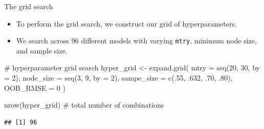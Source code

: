 \documentclass[
  10pt,
  ignorenonframetext,
]{beamer}
\newenvironment{Shaded}{}{}
\newcommand{\CommentTok}[1]{\textcolor[rgb]{0.00,0.50,0.00}{#1}}
\newcommand{\DataTypeTok}[1]{#1}
\newcommand{\DecValTok}[1]{#1}
\newcommand{\FloatTok}[1]{#1}
\newcommand{\KeywordTok}[1]{\textcolor[rgb]{0.00,0.00,1.00}{#1}}
\newcommand{\NormalTok}[1]{#1}
\newcommand{\StringTok}[1]{\textcolor[rgb]{0.00,0.50,0.50}{#1}}
\providecommand{\tightlist}{%
  \setlength{\itemsep}{0pt}\setlength{\parskip}{0pt}}
\begin{document}
\begin{frame}[fragile]{The grid search}
\protect\hypertarget{the-grid-search}{}

\begin{itemize}
\tightlist
\item
  To perform the grid search, we construct our grid of hyperparameters.
\item
  We search across 96 different models with varying \texttt{mtry},
  minimum node size, and sample size.
\end{itemize}

\begin{Shaded}
\begin{Highlighting}[]
\CommentTok{# hyperparameter grid search}
\NormalTok{hyper_grid <-}\StringTok{ }\KeywordTok{expand.grid}\NormalTok{(}
  \DataTypeTok{mtry       =} \KeywordTok{seq}\NormalTok{(}\DecValTok{20}\NormalTok{, }\DecValTok{30}\NormalTok{, }\DataTypeTok{by =} \DecValTok{2}\NormalTok{),}
  \DataTypeTok{node_size  =} \KeywordTok{seq}\NormalTok{(}\DecValTok{3}\NormalTok{, }\DecValTok{9}\NormalTok{, }\DataTypeTok{by =} \DecValTok{2}\NormalTok{),}
  \DataTypeTok{sampe_size =} \KeywordTok{c}\NormalTok{(.}\DecValTok{55}\NormalTok{, }\FloatTok{.632}\NormalTok{, }\FloatTok{.70}\NormalTok{, }\FloatTok{.80}\NormalTok{),}
  \DataTypeTok{OOB_RMSE   =} \DecValTok{0}
\NormalTok{)}

\KeywordTok{nrow}\NormalTok{(hyper_grid) }\CommentTok{# total number of combinations}
\end{Highlighting}
\end{Shaded}

\begin{verbatim}
## [1] 96
\end{verbatim}

\end{frame}
\end{document}
